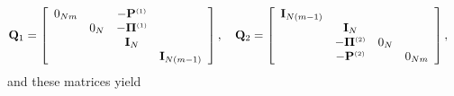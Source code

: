 \begin{align*}
\Q_1 & =
\left[\begin{array}{c c c c}
             0_{Nm} &     & -\POne     &             \\%
                 & 0_N & -\PiOne        &             \\%
                 &     &      \I_N       &             \\%
                 &     &                & \I_{N (m-1)}
      \end{array}\right],\quad
%
\Q_2 =
\left[\begin{array}{c c c c}
\I_{N(m-1)}  &                &     &                 \\%
            & \I_N            &     &                 \\%
            & -\PiTwo        & 0_N &                 \\%
            & -\PTwo         &     & 0_{Nm}
\end{array}\right],
%
\end{align*}
%
and these matrices yield
%
